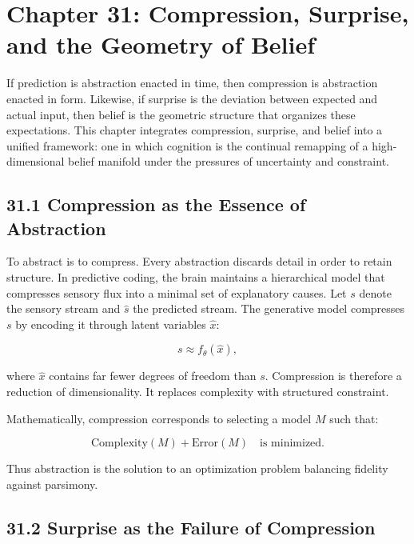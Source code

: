 \documentclass[12pt,letterpaper]{article}
\theoremstyle{remark}
\begin{document}
\newpage
\section{Chapter 31: Compression, Surprise, and the Geometry of Belief}

If prediction is abstraction enacted in time, then compression is abstraction enacted in form. Likewise, if surprise is the deviation between expected and actual input, then belief is the geometric structure that organizes these expectations. This chapter integrates compression, surprise, and belief into a unified framework: one in which cognition is the continual remapping of a high-dimensional belief manifold under the pressures of uncertainty and constraint.

\subsection{31.1 Compression as the Essence of Abstraction}

To abstract is to compress. Every abstraction discards detail in order to retain structure. In predictive coding, the brain maintains a hierarchical model that compresses sensory flux into a minimal set of explanatory causes. Let \(s\) denote the sensory stream and \(\hat{s}\) the predicted stream. The generative model compresses \(s\) by encoding it through latent variables \(\hat{x}\):

\[
s \approx f_\theta(\hat{x}),
\]

where \(\hat{x}\) contains far fewer degrees of freedom than \(s\).  
Compression is therefore a reduction of dimensionality. It replaces complexity with structured constraint.

Mathematically, compression corresponds to selecting a model \(M\) such that:

\[
\text{Complexity}(M) + \text{Error}(M) \quad \text{is minimized.}
\]

Thus abstraction is the solution to an optimization problem balancing fidelity against parsimony.

\subsection{31.2 Surprise as the Failure of Compression}
\end{document}
